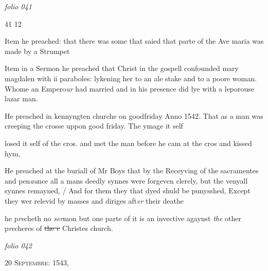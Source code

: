 \documentclass[12pt, a4paper]{book}
\begin{document}
\dotfill
						\newpage
{}

\textit{folio 041}


\begin{flushright}{\color{Mahogany}41} 12\end{flushright}
 
		\ifthenelse{\isodd{\thepage}}
		{\reversemarginpar}
		{\normalmarginpar}
		Item he preached: that there was some that saied
 that parte of the Ave maria was made by
 a Strumpet
	
		\ifthenelse{\isodd{\thepage}}
		{\reversemarginpar}
		{\normalmarginpar}
		Item in a Sermon he preached that Christ
 in the gospell confounded mary magdalen with
 ii paraboles: lykening her to an ale stake
 and to a poore woman. Whome an Empero\textit{ur}
 had married and in his presence did lye
 with a leporouse lazar man.
	
				\marginpar[\vspace{0.5cm}{\textcolor{Gray}{n}}]{}
			
		\ifthenelse{\isodd{\thepage}}
		{\reversemarginpar}
		{\normalmarginpar}
		He preached in kennyngten churche on goodfriday
 Anno 1542. That as a man was creeping
 the crosse uppon good friday. The ymage it self
			
 losed it self of the cros. and met the man before
 he cam at the cros and kissed hym,
	
		\ifthenelse{\isodd{\thepage}}
		{\reversemarginpar}
		{\normalmarginpar}
		He preached at the buriall of Mr Boys that
 by the Receyving of the sacramentes and pen\textit{au}nce
 all a mans deedly synnes were forgeven clerely,
 but the venyall synnes remayned, / And for them
 they that dyed shuld be punysshed, Except
 they wer relevid by masses and diriges aft\textit{er}
 their deathe
	
		\ifthenelse{\isodd{\thepage}}
		{\reversemarginpar}
		{\normalmarginpar}
		he p\textit{re}cheth no \textit{ser}mon but one parte of it is an invective
 agaynst \textit{the} other p\textit{re}cheres of \sout{the c} Christes church.


            
\dotfill
						\newpage
{}

\textit{folio 042}


            
               
				\begin{center} \begin{large} {\scshape 
                  20 Septembre: 1543,
               } \end{large} \end{center}
			
\end{document}
